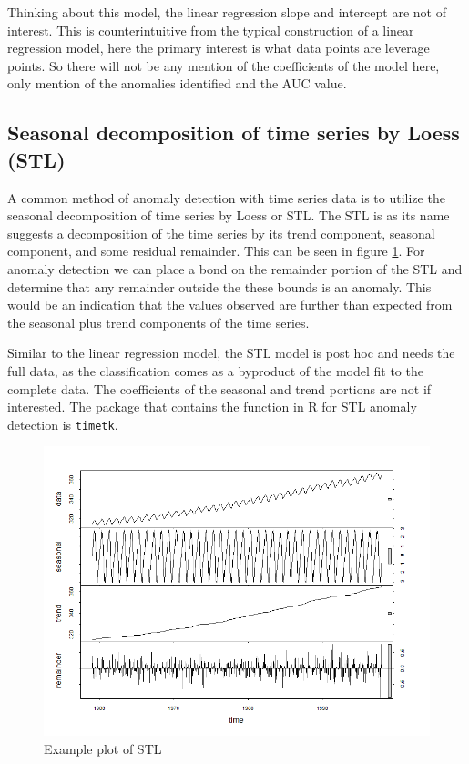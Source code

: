 \documentclass{article}
\begin{document}
Thinking about this model, the linear regression slope and intercept are not of interest. This is counterintuitive from the typical construction of a linear regression model, here the primary interest is what data points are leverage points. So there will not be any mention of the coefficients of the model here, only mention of the anomalies identified and the AUC value.

\subsection{Seasonal decomposition of time series by Loess (STL)}
A common method of anomaly detection with time series data is to utilize the seasonal decomposition of time series by Loess or STL. The STL is as its name suggests a decomposition of the time series by its trend component, seasonal component, and some residual remainder. This can be seen in figure \ref{fig:stl_fig}. For anomaly detection we can place a bond on the remainder portion of the STL and determine that any remainder outside the these bounds is an anomaly. This would be an indication that the values observed are further than expected from the seasonal plus trend components of the time series.

Similar to the linear regression model, the STL model is post hoc and needs the full data, as the classification comes as a byproduct of the model fit to the complete data. The coefficients of the seasonal and trend portions are not if interested. The package that contains the function in R for STL anomaly detection is \texttt{timetk}.

\begin{figure}[ht]
    \centering
    \includegraphics[width=.7\textwidth]{stl_model.png}
    \caption{Example plot of STL}
    \label{fig:stl_fig}
\end{figure}
\end{document}
